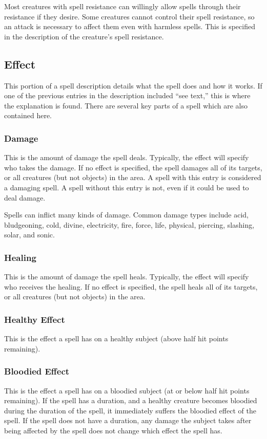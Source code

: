 Most creatures with spell resistance can willingly allow spells through their resistance if they desire. Some creatures cannot control their spell resistance, so an attack is necessary to affect them even with harmless spells. This is specified in the description of the creature's spell resistance.

\subsection{Effect}
This portion of a spell description details what the spell does and how it works. If one of the previous entries in the description included ``see text,'' this is where the explanation is found. There are several key parts of a spell which are also contained here.

\subsubsection{Damage}
This is the amount of damage the spell deals. Typically, the effect will specify who takes the damage. If no effect is specified, the spell damages all of its targets, or all creatures (but not objects) in the area. A spell with this entry is considered a damaging spell. A spell without this entry is not, even if it could be used to deal damage.

Spells can inflict many kinds of damage. Common damage types include acid, bludgeoning, cold, divine, electricity, fire, force, life, physical, piercing, slashing, solar, and sonic.

\subsubsection{Healing}
This is the amount of damage the spell heals. Typically, the effect will specify who receives the healing. If no effect is specified, the spell heals all of its targets, or all creatures (but not objects) in the area.

\subsubsection{Healthy Effect}
This is the effect a spell has on a healthy subject (above half hit points remaining).

\subsubsection{Bloodied Effect}
This is the effect a spell has on a bloodied subject (at or below half hit points remaining). If the spell has a duration, and a healthy creature becomes bloodied during the duration of the spell, it immediately suffers the bloodied effect of the spell. If the spell does not have a duration, any damage the subject takes after being affected by the spell does not change which effect the spell has.

